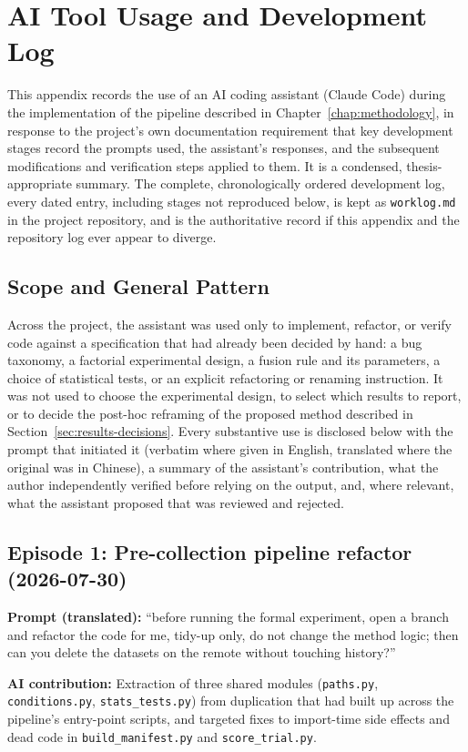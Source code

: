 \chapter{AI Tool Usage and Development Log}
\label{app:genai-log}

This appendix records the use of an AI coding assistant (Claude Code) during the implementation of the pipeline described in Chapter~\ref{chap:methodology}, in response to the project's own documentation requirement that key development stages record the prompts used, the assistant's responses, and the subsequent modifications and verification steps applied to them. It is a condensed, thesis-appropriate summary. The complete, chronologically ordered development log, every dated entry, including stages not reproduced below, is kept as \texttt{worklog.md} in the project repository, and is the authoritative record if this appendix and the repository log ever appear to diverge.

\section{Scope and General Pattern}
Across the project, the assistant was used only to implement, refactor, or verify code against a specification that had already been decided by hand: a bug taxonomy, a factorial experimental design, a fusion rule and its parameters, a choice of statistical tests, or an explicit refactoring or renaming instruction. It was not used to choose the experimental design, to select which results to report, or to decide the post-hoc reframing of the proposed method described in Section~\ref{sec:results-decisions}. Every substantive use is disclosed below with the prompt that initiated it (verbatim where given in English, translated where the original was in Chinese), a summary of the assistant's contribution, what the author independently verified before relying on the output, and, where relevant, what the assistant proposed that was reviewed and rejected.

\section{Episode 1: Pre-collection pipeline refactor (2026-07-30)}
\textbf{Prompt (translated):} ``before running the formal experiment, open a branch and refactor the code for me, tidy-up only, do not change the method logic; then can you delete the datasets on the remote without touching history?''

\textbf{AI contribution:} Extraction of three shared modules (\texttt{paths.py}, \texttt{conditions.py}, \texttt{stats\_tests.py}) from duplication that had built up across the pipeline's entry-point scripts, and targeted fixes to import-time side effects and dead code in \texttt{build\_manifest.py} and \texttt{score\_trial.py}.

